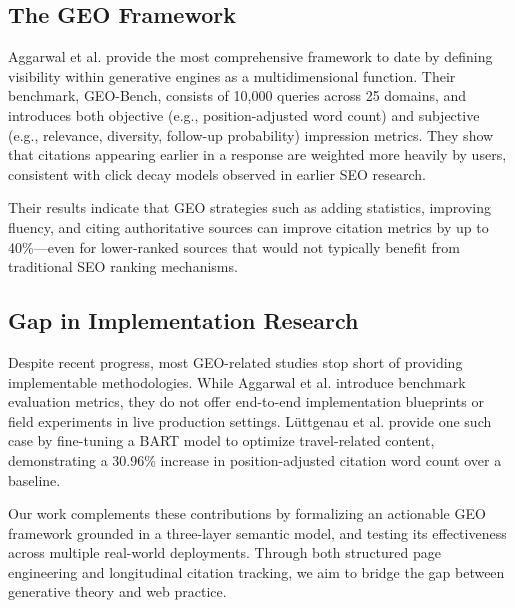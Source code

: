 \subsection{The GEO Framework}

Aggarwal et al. \cite{aggarwal2024geo} provide the most comprehensive framework to date by defining visibility within generative engines as a multidimensional function. Their benchmark, GEO-Bench, consists of 10{,}000 queries across 25 domains, and introduces both objective (e.g., position-adjusted word count) and subjective (e.g., relevance, diversity, follow-up probability) impression metrics. They show that citations appearing earlier in a response are weighted more heavily by users, consistent with click decay models observed in earlier SEO research.

Their results indicate that GEO strategies such as adding statistics, improving fluency, and citing authoritative sources can improve citation metrics by up to 40\%—even for lower-ranked sources that would not typically benefit from traditional SEO ranking mechanisms.

\subsection{Gap in Implementation Research}

Despite recent progress, most GEO-related studies stop short of providing implementable methodologies. While Aggarwal et al. introduce benchmark evaluation metrics, they do not offer end-to-end implementation blueprints or field experiments in live production settings. Lüttgenau et al. \cite{luttgenau2025beyondseo} provide one such case by fine-tuning a BART model to optimize travel-related content, demonstrating a 30.96\% increase in position-adjusted citation word count over a baseline.

Our work complements these contributions by formalizing an actionable GEO framework grounded in a three-layer semantic model, and testing its effectiveness across multiple real-world deployments. Through both structured page engineering and longitudinal citation tracking, we aim to bridge the gap between generative theory and web practice.
